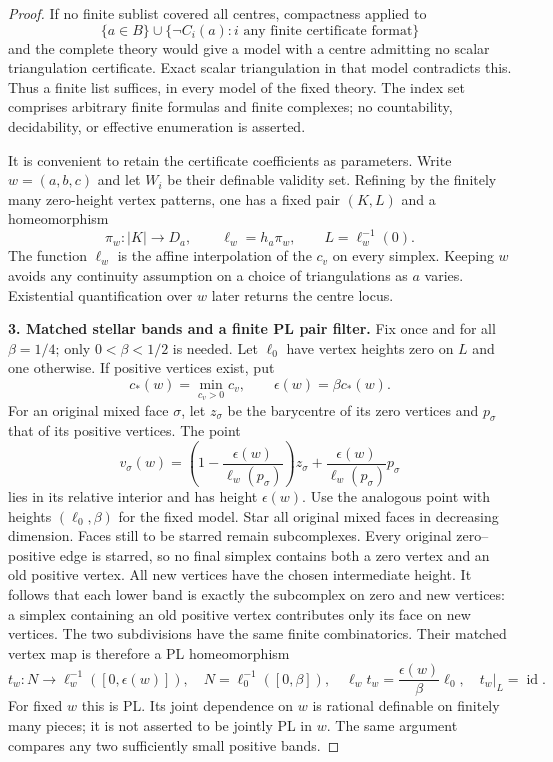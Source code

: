\begin{proof}
If no finite sublist covered all centres, compactness applied to
\[
 \{a\in B\}\cup\{\neg C_i(a):i\text{ any finite certificate format}\}
\]
and the complete theory would give a model with a centre admitting no
scalar triangulation certificate. Exact scalar triangulation in that
model contradicts this. Thus a finite list suffices, in every model of
the fixed theory. The index set comprises arbitrary finite formulas and
finite complexes; no countability, decidability, or effective enumeration
is asserted.

It is convenient to retain the certificate coefficients as parameters.
Write $w=(a,b,c)$ and let $W_i$ be their definable validity set. Refining
by the finitely many zero-height vertex patterns, one has a fixed pair
$(K,L)$ and a homeomorphism
\[
 \pi_w:|K|\longrightarrow D_a,\qquad
 \ell_w=h_a\pi_w,
 \qquad L=\ell_w^{-1}(0).
 \tag{A5.19.3}
\]
The function $\ell_w$ is the affine interpolation of the $c_v$ on every
simplex. Keeping $w$ avoids any continuity assumption on a choice of
triangulations as $a$ varies. Existential quantification over $w$ later
returns the centre locus.

\textbf{3. Matched stellar bands and a finite PL pair filter.}\quad
Fix once and for all $\beta=1/4$; only $0<\beta<1/2$ is needed.
Let $\ell_0$ have vertex heights zero on $L$ and one otherwise.
If positive vertices exist, put
\[
 c_*(w)=\min_{c_v>0}c_v,\qquad \epsilon(w)=\beta c_*(w).
\]
For an original mixed face $\sigma$, let $z_\sigma$ be the barycentre of
its zero vertices and $p_\sigma$ that of its positive vertices. The point
\[
 v_\sigma(w)=
 \left(1-\frac{\epsilon(w)}{\ell_w(p_\sigma)}\right)z_\sigma+
 \frac{\epsilon(w)}{\ell_w(p_\sigma)}p_\sigma
 \tag{A5.19.4}
\]
lies in its relative interior and has height $\epsilon(w)$. Use the
analogous point with heights $(\ell_0,\beta)$ for the fixed model.
Star all original mixed faces in decreasing dimension. Faces still to
be starred remain subcomplexes. Every original zero--positive edge is
starred, so no final simplex contains both a zero vertex and an old
positive vertex. All new vertices have the chosen intermediate height.
It follows that each lower band is exactly the subcomplex on zero and
new vertices: a simplex containing an old positive vertex contributes
only its face on new vertices. The two subdivisions have the same finite
combinatorics. Their matched vertex map is therefore a PL homeomorphism
\[
 t_w:N\longrightarrow \ell_w^{-1}([0,\epsilon(w)]),
 \quad N=\ell_0^{-1}([0,\beta]),
 \quad \ell_w t_w=\frac{\epsilon(w)}\beta\ell_0,
 \quad t_w|_L=\operatorname{id}.
 \tag{A5.19.5}
\]
For fixed $w$ this is PL. Its joint dependence on $w$ is rational definable
on finitely many pieces; it is not asserted to be jointly PL in $w$.
The same argument compares any two sufficiently small positive bands.


\end{proof}
